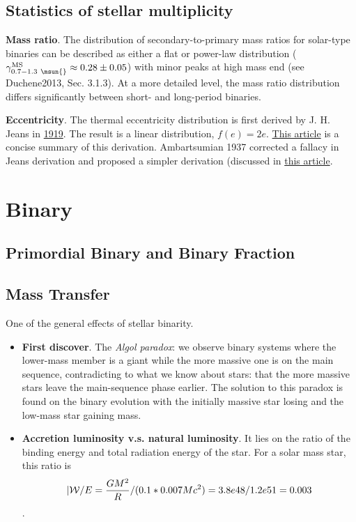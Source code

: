 \subsection{Statistics of stellar multiplicity}

{\bf Mass ratio}. The distribution of secondary-to-primary mass ratios for solar-type binaries can be described as either a flat or power-law distribution ($\gamma^{\rm MS}_{0.7 - 1.3 \ \msun{}} \approx 0.28 \pm 0.05$) with minor peaks at high mass end (see Duchene2013, Sec. 3.1.3). At a more detailed level, the mass ratio distribution differs significantly between short- and long-period binaries. 

{\bf Eccentricity}. The thermal eccentricity distribution is first derived by J. H. Jeans in \href{https://ui.adsabs.harvard.edu/abs/1919MNRAS..79..408J/abstract}{1919}. The result is a linear distribution, $f(e) = 2e$. \href{https://joe-antognini.github.io/astronomy/thermal-eccentricities}{This article} is a concise summary of this derivation. Ambartsumian 1937 corrected a fallacy in Jeans derivation and proposed a simpler derivation (discussed in \href{https://joe-antognini.github.io/astronomy/ambartsumian-distribution}{this article}. 

\section{Binary}
\label{sec:bin}

\subsection{Primordial Binary and Binary Fraction}
\label{sec:org7b2ff36}

\subsection{Mass Transfer}
\label{sec:org4cb965b}

One of the general effects of stellar binarity.
\begin{itemize}
\item \textbf{First discover}. The \emph{Algol paradox}: we observe binary systems where the lower-mass member is a giant while the more massive one is on the main sequence, contradicting to what we know about stars: that the more massive stars leave the main-sequence phase earlier. The solution to this paradox is found on the binary evolution with the initially massive star losing and the low-mass star gaining mass.
\item \textbf{Accretion luminosity v.s. natural luminosity}. It lies on the ratio of the binding energy and total radiation energy of the star. For a solar mass star, this ratio is $$|{\cal W} / E = \frac{G M^{2}}{R} / (0.1 * 0.007 M c^2) = 3.8e48 / 1.2e51 = 0.003$$.
\end{itemize}


